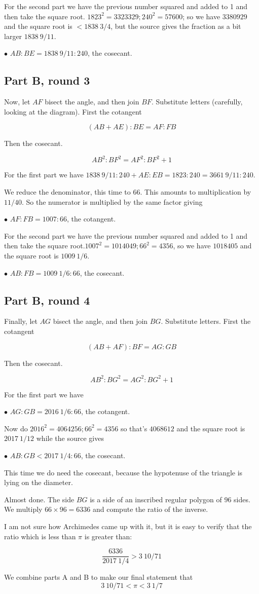 \documentclass[11pt, oneside]{article}
\begin{document}
For the second part we have the previous number squared and added to 1 and then take the square root.
$1823^2 = 3323329;  240^2 = 57600$;  so we have $3380929$ and the square root is $< 1838 \ 3/4$, but the source gives the fraction as a bit larger $1838 \ 9/11$.

$\bullet$ $AB:BE = 1838 \ 9/11: 240$, the cosecant.

\subsection*{Part B, round 3}

Now, let $AF$ bisect the angle, and then join $BF$.  Substitute letters (carefully, looking at the diagram).  First the cotangent

\[ (AB + AE):BE = AF:FB \]

Then the cosecant.

\[ AB^2:BF^2 = AF^2:BF^2 + 1 \]

For the first part we have $1838 \ 9/11: 240 + AE:EB = 1823:240 = 3661 \ 9/11:240$. 

 We reduce the denominator, this time to $66$.  This amounts to multiplication by $11/40$.  So the numerator is multiplied by the same factor giving

$\bullet$ $AF:FB = 1007:66$, the cotangent.

For the second part we have the previous number squared and added to 1 and then take the square root.$1007^2 = 1014049;  66^2 = 4356$, so we have $1018405$ and the square root is $1009 \ 1/6$.

$\bullet$ $AB:FB = 1009 \ 1/6:66$, the cosecant.

\subsection*{Part B, round 4}

Finally, let $AG$ bisect the angle, and then join $BG$.  Substitute letters.  First the cotangent

\[ (AB + AF):BF = AG:GB \]

Then the cosecant.

\[ AB^2:BG^2 = AG^2:BG^2 + 1 \]

For the first part we have

$\bullet$ $AG:GB = 2016 \ 1/6:66$, the cotangent.

Now do $2016^2 = 4064256;  66^2 = 4356$ so that's $4068612$ and the square root is $2017 \ 1/12$ while the source gives

$\bullet$ $AB:GB < 2017 \ 1/4:66$, the cosecant.

This time we do need the cosecant, because the hypotenuse of the triangle is lying on the diameter.

Almost done.  The side $BG$ is a side of an inscribed regular polygon of $96$ sides.  We multiply $66 \times 96 = 6336$ and compute the ratio of the inverse.  

I am not sure how Archimedes came up with it, but it is easy to verify that the ratio which is less than $\pi$ is greater than:

\[ \frac{6336}{2017 \ 1/4} > 3 \ 10/71 \]

We combine parts A and B to make our final statement that
\[ 3 \ 10/71 < \pi < 3 \ 1/7 \]
\end{document}
